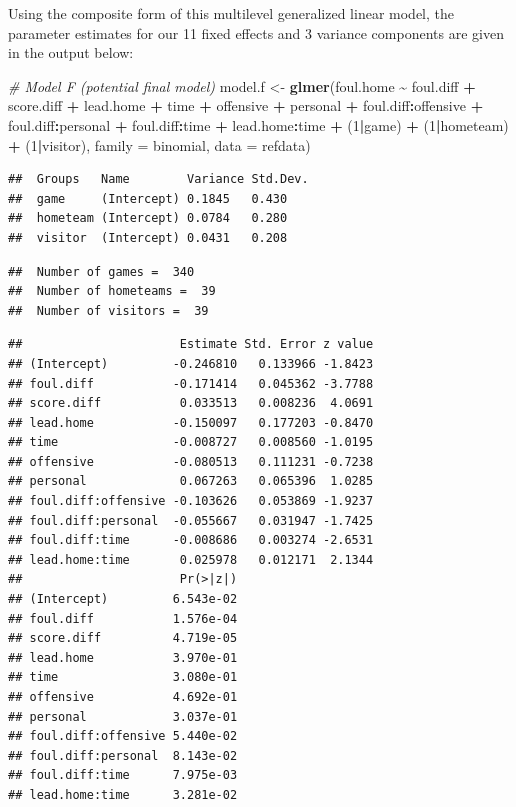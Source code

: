 \documentclass[
]{krantz}
\newenvironment{Shaded}{\begin{snugshade}}{\end{snugshade}}
\newcommand{\AttributeTok}[1]{\textcolor[rgb]{0.27,0.27,0.27}{#1}}
\newcommand{\CommentTok}[1]{\textcolor[rgb]{0.37,0.37,0.37}{\textit{#1}}}
\newcommand{\DecValTok}[1]{\textcolor[rgb]{0.06,0.06,0.06}{#1}}
\newcommand{\FunctionTok}[1]{\textcolor[rgb]{0.27,0.27,0.27}{\textbf{#1}}}
\newcommand{\NormalTok}[1]{#1}
\newcommand{\OtherTok}[1]{\textcolor[rgb]{0.37,0.37,0.37}{#1}}
\newcommand{\SpecialCharTok}[1]{\textcolor[rgb]{0.43,0.43,0.43}{\textbf{#1}}}
\begin{document}
Using the composite form of this multilevel generalized linear model, the parameter estimates for our 11 fixed effects and 3 variance components are given in the output below:

\begin{Shaded}
\begin{Highlighting}[]
\CommentTok{\# Model F (potential final model)}
\NormalTok{model.f }\OtherTok{\textless{}{-}} \FunctionTok{glmer}\NormalTok{(foul.home }\SpecialCharTok{\textasciitilde{}}\NormalTok{ foul.diff }\SpecialCharTok{+}\NormalTok{ score.diff }\SpecialCharTok{+} 
\NormalTok{  lead.home }\SpecialCharTok{+}\NormalTok{ time }\SpecialCharTok{+}\NormalTok{ offensive }\SpecialCharTok{+}\NormalTok{ personal }\SpecialCharTok{+} 
\NormalTok{  foul.diff}\SpecialCharTok{:}\NormalTok{offensive }\SpecialCharTok{+}\NormalTok{ foul.diff}\SpecialCharTok{:}\NormalTok{personal }\SpecialCharTok{+} 
\NormalTok{  foul.diff}\SpecialCharTok{:}\NormalTok{time }\SpecialCharTok{+}\NormalTok{ lead.home}\SpecialCharTok{:}\NormalTok{time }\SpecialCharTok{+}\NormalTok{ (}\DecValTok{1}\SpecialCharTok{|}\NormalTok{game) }\SpecialCharTok{+} 
\NormalTok{  (}\DecValTok{1}\SpecialCharTok{|}\NormalTok{hometeam) }\SpecialCharTok{+}\NormalTok{ (}\DecValTok{1}\SpecialCharTok{|}\NormalTok{visitor),}
  \AttributeTok{family =}\NormalTok{ binomial, }\AttributeTok{data =}\NormalTok{ refdata)}
\end{Highlighting}
\end{Shaded}

\begin{verbatim}
##  Groups   Name        Variance Std.Dev.
##  game     (Intercept) 0.1845   0.430   
##  hometeam (Intercept) 0.0784   0.280   
##  visitor  (Intercept) 0.0431   0.208
\end{verbatim}

\begin{verbatim}
##  Number of games =  340 
##  Number of hometeams =  39 
##  Number of visitors =  39
\end{verbatim}

\begin{verbatim}
##                      Estimate Std. Error z value
## (Intercept)         -0.246810   0.133966 -1.8423
## foul.diff           -0.171414   0.045362 -3.7788
## score.diff           0.033513   0.008236  4.0691
## lead.home           -0.150097   0.177203 -0.8470
## time                -0.008727   0.008560 -1.0195
## offensive           -0.080513   0.111231 -0.7238
## personal             0.067263   0.065396  1.0285
## foul.diff:offensive -0.103626   0.053869 -1.9237
## foul.diff:personal  -0.055667   0.031947 -1.7425
## foul.diff:time      -0.008686   0.003274 -2.6531
## lead.home:time       0.025978   0.012171  2.1344
##                      Pr(>|z|)
## (Intercept)         6.543e-02
## foul.diff           1.576e-04
## score.diff          4.719e-05
## lead.home           3.970e-01
## time                3.080e-01
## offensive           4.692e-01
## personal            3.037e-01
## foul.diff:offensive 5.440e-02
## foul.diff:personal  8.143e-02
## foul.diff:time      7.975e-03
## lead.home:time      3.281e-02
\end{verbatim}
\end{document}
